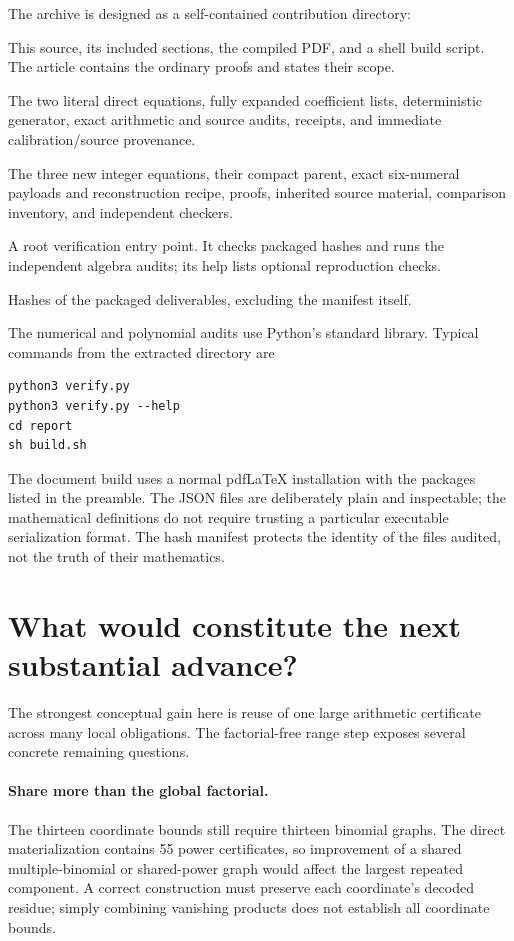 \documentclass[11pt,letterpaper]{article}
\newcommand{\file}[1]{\nolinkurl{#1}}
\begin{document}
The archive is designed as a self-contained contribution directory:
\begin{description}[style=nextline]
\item[\file{report/}]
This source, its included sections, the compiled PDF, and a shell build
script. The article contains the ordinary proofs and states their scope.
\item[\file{direct/}]
The two literal direct equations, fully expanded coefficient lists,
deterministic generator, exact arithmetic and source audits, receipts,
and immediate calibration/source provenance.
\item[\file{coordinate_family/}]
The three new integer equations, their compact parent, exact six-numeral
payloads and reconstruction recipe, proofs, inherited source material,
comparison inventory, and independent checkers.
\item[\file{verify.py}]
A root verification entry point. It checks packaged hashes and runs the
independent algebra audits; its help lists optional reproduction checks.
\item[\file{MANIFEST.sha256}]
Hashes of the packaged deliverables, excluding the manifest itself.
\end{description}

The numerical and polynomial audits use Python's standard library.
Typical commands from the extracted directory are
\begin{verbatim}
python3 verify.py
python3 verify.py --help
cd report
sh build.sh
\end{verbatim}
The document build uses a normal pdfLaTeX installation with the packages
listed in the preamble. The JSON files are deliberately plain and
inspectable; the mathematical definitions do not require trusting a
particular executable serialization format. The hash manifest protects
the identity of the files audited, not the truth of their mathematics.

\section{What would constitute the next substantial advance?}

The strongest conceptual gain here is reuse of one large arithmetic
certificate across many local obligations. The factorial-free range
step exposes several concrete remaining questions.

\paragraph{Share more than the global factorial.}
The thirteen coordinate bounds still require thirteen binomial graphs.
The direct materialization contains 55 power certificates, so improvement
of a shared multiple-binomial or shared-power graph would affect the
largest repeated component. A correct construction must preserve each
coordinate's decoded residue; simply combining vanishing products does
not establish all coordinate bounds.
\end{document}
